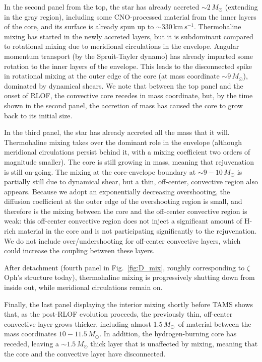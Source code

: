 \documentclass[twocolumn,twocolappendix,trackchanges]{aastex63}
\newcommand{\kms}{{\mathrm{km\ s^{-1}}}}
\DeclareRobustCommand{\Figref}[1]{Fig.~\ref{#1}}
\newcommand{\zoph}{$\zeta$ Oph}
\newcommand{\Msun}{\ensuremath{\,M_\odot}}
\begin{document}
In the second panel from the top, the star has already accreted
$\sim{}2\,M_\odot$ (extending in the gray region), including some
CNO-processed material from the inner layers of the core, and its
surface is already spun up to $\sim{}330\,\kms$. Thermohaline mixing
has started in the newly accreted layers, but it is subdominant
compared to rotational mixing due to meridional circulations in the
envelope. Angular momentum transport (by the Spruit-Tayler dynamo) has
already imparted some rotation to the inner layers of the
envelope. This leads to the disconnected spike in rotational mixing at
the outer edge of the core (at mass coordinate $\sim{}9\Msun$),
dominated by dynamical shears.  We note that between the top panel and
the onset of RLOF, the convective core recedes in mass coordinate,
but, by the time shown in the second panel, the accretion of mass has
caused the core to grow back to its initial size.

In the third panel, the star has already accreted all the mass that it
will. Thermohaline mixing takes over the dominant role in the
envelope (although meridional circulations persist behind it, with a
mixing coefficient two orders of magnitude smaller). The core is still
growing in mass, meaning that rejuvenation is still on-going. The
mixing at the core-envelope boundary at $\sim9-10\Msun$ is partially
still due to dynamical shear, but a thin, off-center, convective
region also appears. Because we adopt an exponentially decreasing
overshooting, the diffusion coefficient at the outer edge of the
overshooting region is small, and therefore is the mixing between the
core and the off-center convective region is weak: this off-center
convective region does not inject a significant amount of H-rich
material in the core and is not participating significantly to the
rejuvenation. We do not include
over/undershooting for off-center convective layers, which could
increase the coupling between these layers.

After detachment (fourth panel in \Figref{fig:D_mix}, roughly
corresponding to \zoph's structure today), thermohaline mixing is
progressively shutting down from inside out, while meridional
circulations remain on.

Finally, the last panel displaying the interior mixing shortly before
TAMS shows that, as the post-RLOF evolution proceeds, the previously
thin, off-center convective layer grows thicker, including almost
1.5\Msun\ of material between the mass coordinates $10-11.5\Msun$. In
addition, the hydrogen-burning core has receded, leaving a
$\sim 1.5\Msun$ thick layer that is unaffected by mixing, meaning
that the core and the convective layer have disconnected.
\end{document}
